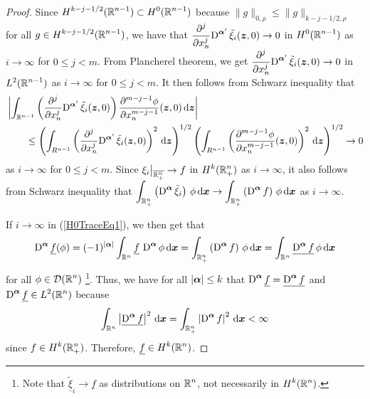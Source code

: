 \begin{proof}
Since $\displaystyle H^{k-j -1/2}(\RR^{n-1}) \subset H^0(\RR^{n-1})$
because $\|g\|_{0,\rho} \leq \|g\|_{k-j -1/2,\rho}$ for all
$\displaystyle g \in H^{k-j -1/2}(\RR^{n-1})$, we have that
$\displaystyle \pdfdxn{\diff^{\VEC{\alpha}'}
\tilde{\xi}_i}{x_n}{j}(\VEC{z},0) \to 0$
in $\displaystyle H^0(\RR^{n-1})$ as $i \to \infty$ for $0 \leq j <m$.
From Plancherel theorem, we get
$\displaystyle \pdfdxn{\diff^{\VEC{\alpha}'}
\tilde{\xi}_i}{x_n}{j}(\VEC{z},0) \to 0$
in $\displaystyle L^2(\RR^{n-1})$ as $i \to \infty$ for $0 \leq j <m$.
It then follows from Schwarz inequality that
\begin{align*}
&\left| \int_{\RR^{n-1}}
\left( \pdfdxn{\diff^{\VEC{\alpha}'} \tilde{\xi}_i}{x_n}{j}(\VEC{z},0) \right)
\pdydxn{\phi}{x_n}{m-j-1}(\VEC{z},0) 
\dx{\VEC{z}} \right| \\
& \qquad \leq
\left( \int_{R^{n-1}} \left(
\pdfdxn{\diff^{\VEC{\alpha}'} \tilde{\xi}_i}{x_n}{j}(\VEC{z},0) \right)^2
\dx{\VEC{z}} \right)^{1/2}
\left( \int_{R^{n-1}} \left( \pdydxn{\phi}{x_n}{m-j-1}(\VEC{z},0) \right)^2
\dx{\VEC{z}} \right)^{1/2} \to 0
\end{align*}
as $i \to \infty$ for $0 \leq j <m$.
Since $\displaystyle \xi_i\big|_{\overline{\RR^n_+}} \to f$ in
$\displaystyle H^k(\RR^n_+)$ as $i \to \infty$, it also follows from Schwarz
inequality that
$\displaystyle \int_{\RR^n_+} \left(\diff^{\VEC{\alpha}}
\tilde{\xi}_i\right)\, \phi \dx{\VEC{x}}
\to \int_{\RR^n_+} \left(\diff^{\VEC{\alpha}} f\right) \, \phi \dx{\VEC{x}}$
as $i \to \infty$.

If $i \to \infty$ in (\ref{H0TraceEq1}), we then
get that
\[
\diff^{\VEC{\alpha}} \underline{f} (\phi)
= (-1)^{|\VEC{\alpha}|} \int_{\RR^n}
\underline{f}\, \diff^{\VEC{\alpha}} \phi \dx{\VEC{x}}
= \int_{\RR^n_+} \left(\diff^{\VEC{\alpha}} f \right)\, \phi \dx{\VEC{x}}
= \int_{\RR^n} \underline{\diff^{\VEC{\alpha}} f}\, \phi \dx{\VEC{x}}
\]
for all $\displaystyle \phi \in \DD(\RR^n)$ \footnote{Note that
$\underline{\tilde{\xi}}_i \to \underline{f}$ as distributions on
$\displaystyle \RR^n$, not necessarily in $\displaystyle H^k(\RR^n)$.}.
Thus, we have for all $|\VEC{\alpha}| \leq k$
that $\displaystyle \diff^{\VEC{\alpha}} \underline{f}
= \underline{\diff^{\VEC{\alpha}} f}$
and $\displaystyle \diff^{\VEC{\alpha}} \underline{f} \in L^2(\RR^n)$ because
\[
\int_{\RR^n} \left|\underline{\diff^{\VEC{\alpha}} f}\right|^2 \dx{\VEC{x}}
= \int_{\RR^n_+} \left|\diff^{\VEC{\alpha}} f\right|^2 \dx{\VEC{x}} < \infty
\]
since $\displaystyle f \in H^k(\RR^n_+)$.
Therefore, $\displaystyle \underline{f} \in H^k(\RR^n)$.
\end{proof}

